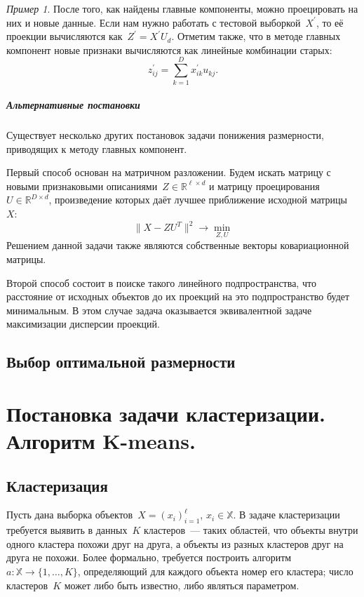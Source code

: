 \documentclass[a4paper, 12pt]{article}
\def\XX{\mathbb{X}}
\theoremstyle{plain} %
\theoremstyle{definition} %
\theoremstyle{remark} %
\newtheorem{example}{Пример}
\begin{document}
\begin{example}
После того, как найдены главные компоненты, можно проецировать на них и новые данные.
Если нам нужно работать с тестовой выборкой~$X^\prime$, то её проекции вычисляются как~$Z^\prime = X^\prime U_d$.
Отметим также, что в методе главных компонент новые признаки вычисляются как линейные комбинации старых:
\[
    z^{\prime}_{ij}
    =
    \sum_{k = 1}^{D}
    x^{\prime}_{ik} u_{kj}.
\]

\subparagraph{Альтернативные постановки}

Существует несколько других постановок задачи понижения размерности,
приводящих к методу главных компонент.

Первый способ основан на матричном разложении.
Будем искать матрицу с новыми признаковыми описаниями~$Z \in \mathbb{R}^{\ell \times d}$
и матрицу проецирования~$U \in \mathbb{R}^{D \times d}$,
произведение которых даёт лучшее приближение исходной матрицы~$X$:
\[
    \| X - Z U^T \|^2
    \to
    \min_{Z, U}
\]
Решением данной задачи также являются собственные векторы ковариационной матрицы.

Второй способ состоит в поиске такого линейного подпространства,
что расстояние от исходных объектов до их проекций на это подпространство
будет минимальным.
В этом случае задача оказывается эквивалентной задаче максимизации дисперсии проекций.

\subsection{Выбор оптимальной размерности}

\section{Постановка задачи кластеризации. Алгоритм K-means.}

\subsection{Кластеризация}

Пусть дана выборка объектов~$X = (x_i)_{i = 1}^{\ell}$, $x_i \in \XX$.
В задаче кластеризации требуется выявить в данных~$K$ кластеров~---
таких областей, что объекты внутри одного кластера похожи друг на друга,
а объекты из разных кластеров друг на друга не похожи.
Более формально, требуется построить алгоритм~$a: \XX \to \{1, \dots, K\}$,
определяющий для каждого объекта номер его кластера;
число кластеров~$K$ может либо быть известно, либо являться параметром.


\end{example}
\end{document}
